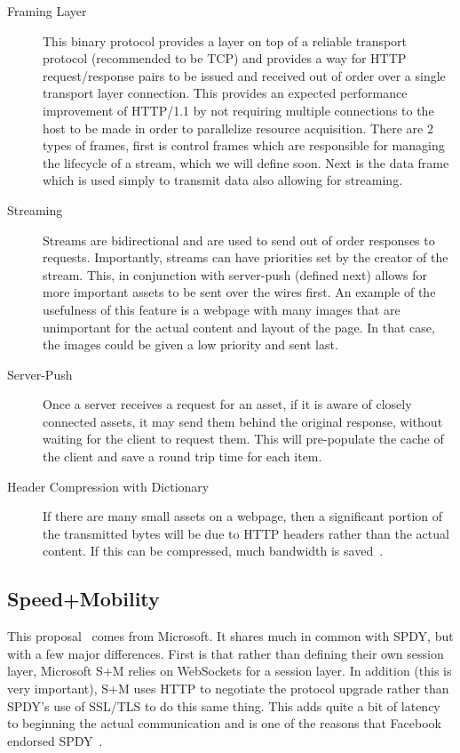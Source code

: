 \documentclass[11pt,letterpaper,notitlepage]{article}
\begin{document}
\begin{description}
\item[Framing Layer] This binary protocol provides a layer on top of a reliable transport
protocol (recommended to be TCP) and provides a way for HTTP request/response
pairs to be issued and received out of order over a single transport layer
connection.  This provides an expected performance improvement of HTTP/1.1 by
not requiring multiple connections to the host to be made in order to
parallelize resource acquisition. There are 2 types of frames, first is control
frames which are responsible for managing the lifecycle of a stream, which we
will define soon.  Next is the data frame which is used simply to transmit data
also allowing for streaming.
\item[Streaming] Streams are bidirectional and are used to send out of order
responses to requests. Importantly, streams can have priorities set by the
creator of the stream.  This, in conjunction with server-push (defined next)
allows for more important assets to be sent over the wires first.  An example of
the usefulness of this feature is a webpage with many images that are
unimportant for the actual content and layout of the page.  In that case, the
images could be given a low priority and sent last.
\item[Server-Push] Once a server receives a request for an asset, if it is aware
of closely connected assets, it may send them behind the original response,
without waiting for the client to request them.  This will pre-populate the
cache of the client and save a round trip time for each item.
\item[Header Compression with Dictionary] If there are many small assets on a
webpage, then a significant portion of the transmitted bytes will be due to HTTP
headers rather than the actual content.  If this can be compressed, much
bandwidth is saved~\cite{binoy}.
\end{description}

\subsection{Speed+Mobility}
\label{sec:background/s+m}
This proposal~\cite{sm} comes from Microsoft.  It shares much in common with
SPDY, but with a few major differences. First is that rather than defining
their own session layer, Microsoft S+M relies on WebSockets for a session
layer.  In addition (this is very important), S+M uses HTTP to negotiate the
protocol upgrade rather than SPDY's use of SSL/TLS to do this same thing. This
adds quite a bit of latency to beginning the actual communication and is one of
the reasons that Facebook endorsed SPDY~\cite{fbook}.
\end{document}
